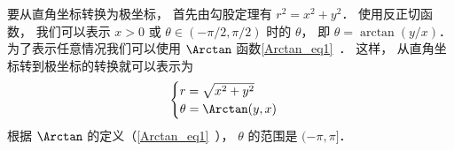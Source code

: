 要从直角坐标转换为极坐标， 首先由勾股定理有 $r^2 = x^2 + y^2$． 使用反正切函数， 我们可以表示 $x >0$ 或 $\theta\in(-\pi/2,\pi/2)$ 时的 $\theta$， 即 $\theta = \arctan(y/x)$． 为了表示任意情况我们可以使用 $\Arctan$ 函数\autoref{Arctan_eq1}~． 这样， 从直角坐标转到极坐标的转换就可以表示为
\begin{equation}\label{Polar_eq4}
\begin{cases}
r = \sqrt{x^2 + y^2}\\
\theta = \Arctan(y, x)
\end{cases}
\end{equation}
根据 $\Arctan$ 的定义（\autoref{Arctan_eq1}~）， $\theta$ 的范围是 $(-\pi, \pi]$．
